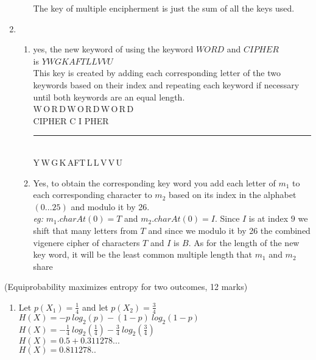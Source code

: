 \documentclass{assignment}
\newcommand*{\xdash}[1][3em]{\rule[0.5ex]{#1}{0.55pt}}
\begin{document}
\begin{problemlist}
\begin{problem}
\begin{answer}
\begin{enumerate}[label=(\alph*)]
\begin{enumerate}[label=(\roman*)]
				The key of multiple encipherment is just the sum of all the keys used.
			\end{enumerate}


	\item 	\begin{enumerate}[label=(\roman*)]
			\item yes, the new keyword of using the keyword $WORD$  and $CIPHER$ \\ is $YWGKAFTLLVVU$\\
			This key is created by adding each corresponding letter of the two keywords based on their index and repeating each keyword 
			if necessary until both keywords are an equal length. \\
		
			
			W\,O\,R\,D\,W\,O\,R\,D\,W\,O\,R\,D \\
			C\enspace I\enspace P\;H\;E\enspace R C I P\:H\;E\;R \\
			\xdash[12em] \\ 
			Y\,W\,G\,K\,A\enspace F\enspace T\,L\,L\,V\,V\,U
			
			


			\item Yes, to obtain the corresponding key word you add each letter of $m_1$ to each corresponding character to $m_2$ based on its index in the alphabet $(0 ... 25) $ and modulo it by 26. \\
			\textit{eg:} $m_1.charAt(0) = T$ and $m_2.charAt(0) = I$. Since $I$ is at index $9$ we shift that many letters from $T$ and since we modulo it by 26 the combined vigenere cipher of characters $T$ and $I$ is $B$.
			As for the length of the new key word, it will be the least common multiple length that $m_1$ and $m_2$ share
			\end{enumerate}
\end{enumerate}
\end{answer}
\end{problem}

\pbitem (Equiprobability maximizes entropy for two outcomes, 12 marks)
\begin{problem}
\begin{answer}
\begin{enumerate}[label=(\alph*)]
	\item	Let $ p(X_1) = \frac{1}{4} $ and let $ p(X_2) = \frac{3}{4} $	\\
			$H(X) = -p \ log_2(p) -(1-p) \ log_2(1-p) $ \\
			$H(X) = -\frac{1}{4} \ log_2(\frac{1}{4}) -\frac{3}{4} \ log_2(\frac{3}{4}) $ \\
			$H(X) = 0.5 + 0.311278...$ \\
			$H(X) = 0.811278.. $
			

\end{enumerate}
\end{answer}
\end{problem}
\end{problemlist}
\end{document}
